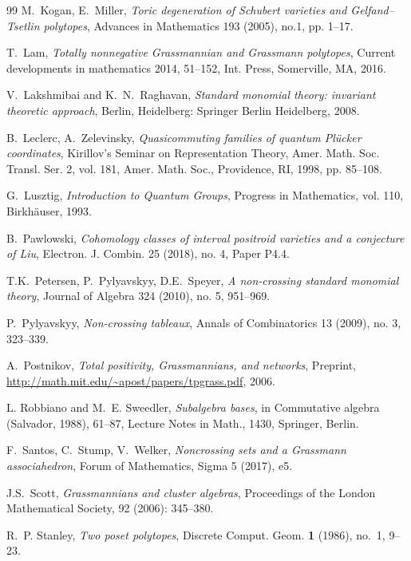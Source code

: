 \documentclass[11pt]{amsart}
\numberwithin{equation}{section}
\begin{document}
\begin{thebibliography}{99}
M.~Kogan, E.~Miller, 
\emph{Toric degeneration of Schubert varieties and Gelfand–Tsetlin polytopes}, 
Advances in Mathematics 193 (2005), no.1, pp. 1--17.

 T.~Lam, \emph{Totally nonnegative Grassmannian and Grassmann polytopes}, Current developments in mathematics 2014, 51–152, Int. Press, Somerville, MA, 2016.



 V.~Lakshmibai and K.~N.~Raghavan, \textit{Standard monomial theory: invariant theoretic approach}, Berlin, Heidelberg: Springer Berlin Heidelberg, 2008.

B.~Leclerc, A.~Zelevinsky, 
\emph{Quasicommuting families of quantum Pl\"ucker coordinates}, 
Kirillov's Seminar on Representation Theory, Amer. Math. Soc. Transl. Ser. 2, 
vol. 181, Amer. Math. Soc., Providence, RI, 1998, pp. 85--108.

G.~Lusztig, \emph{Introduction to Quantum Groups}, 
Progress in Mathematics, vol. 110, Birkh\"auser, 1993.


B.~Pawlowski, \emph{Cohomology classes of interval positroid varieties and a conjecture of Liu},
Electron. J. Combin. 25 (2018), no. 4, Paper P4.4.

T.K.~Petersen, P.~Pylyavskyy, D.E.~Speyer, 
\emph{A non-crossing standard monomial theory}, Journal of Algebra 324 (2010), 
no. 5, 951--969.

P.~Pylyavskyy, \emph{Non-crossing tableaux}, Annals of Combinatorics 13 (2009), 
no. 3, 323--339.


 A.~Postnikov, \emph{Total  positivity,   Grassmannians,   and  networks},  Preprint, \url{http://math.mit.edu/~apost/papers/tpgrass.pdf}, 2006.


 L. Robbiano and M.~E. Sweedler, \emph{Subalgebra bases}, in Commutative algebra (Salvador, 1988), 61--87, Lecture Notes in Math., 1430, Springer, Berlin.

F.~Santos, C.~Stump, V.~Welker, 
\emph{Noncrossing sets and a Grassmann associahedron}, Forum of Mathematics, 
Sigma 5 (2017), e5.

J.S.~Scott,   \emph{Grassmannians and cluster algebras},
Proceedings of the London Mathematical Society, 92 (2006): 345--380.


 R.~P. Stanley, \emph{Two poset polytopes}, Discrete Comput. Geom. {\bf 1} (1986), no.~1, 9--23.


\end{thebibliography}
\end{document}
